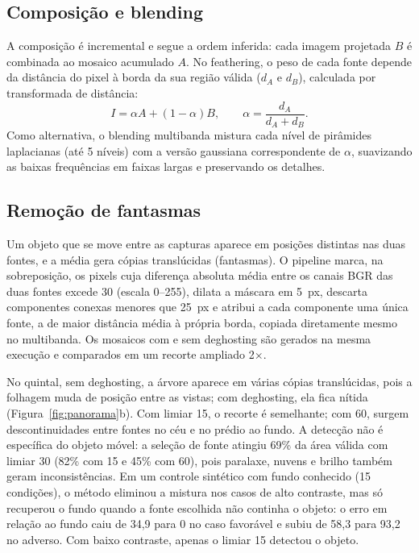 \documentclass[10pt,a4paper]{article}
\begin{document}
\subsection{Composição e blending}
A composição é incremental e segue a ordem inferida: cada imagem projetada $B$ é combinada ao mosaico
acumulado $A$. No feathering, o peso de cada fonte depende da distância do pixel à borda da sua região
válida ($d_A$ e $d_B$), calculada por transformada de distância:
\begin{equation}
  I = \alpha A + (1-\alpha) B, \qquad \alpha = \frac{d_A}{d_A + d_B} .
\end{equation}
Como alternativa, o blending multibanda \cite{burt1983} mistura cada nível de pirâmides laplacianas (até 5
níveis) com a versão gaussiana correspondente de $\alpha$, suavizando as baixas frequências em faixas
largas e preservando os detalhes.

\subsection{Remoção de fantasmas}
Um objeto que se move entre as capturas aparece em posições distintas nas duas fontes, e a média gera
cópias translúcidas (fantasmas). O pipeline marca, na sobreposição, os pixels cuja diferença absoluta média
entre os canais BGR das duas fontes excede 30 (escala 0--255), dilata a máscara em 5~px, descarta
componentes conexas menores que 25~px e atribui a cada componente uma única fonte, a de maior distância
média à própria borda, copiada diretamente mesmo no multibanda. Os mosaicos com e sem deghosting são
gerados na mesma execução e comparados em um recorte ampliado 2$\times$.

No quintal, sem deghosting, a árvore aparece em várias cópias translúcidas, pois a folhagem muda de
posição entre as vistas; com deghosting, ela fica nítida (Figura~\ref{fig:panorama}b). Com limiar 15, o
recorte é semelhante; com 60, surgem descontinuidades entre fontes no céu e no prédio ao fundo. A detecção
não é específica do objeto móvel: a seleção de fonte atingiu 69\% da área válida com limiar 30 (82\% com
15 e 45\% com 60), pois paralaxe, nuvens e brilho também geram inconsistências. Em um controle sintético
com fundo conhecido (15 condições), o método eliminou a mistura nos casos de alto contraste, mas só
recuperou o fundo quando a fonte escolhida não continha o objeto: o erro em relação ao fundo caiu de 34,9
para 0 no caso favorável e subiu de 58,3 para 93,2 no adverso. Com baixo contraste, apenas o limiar 15
detectou o objeto.
\end{document}
